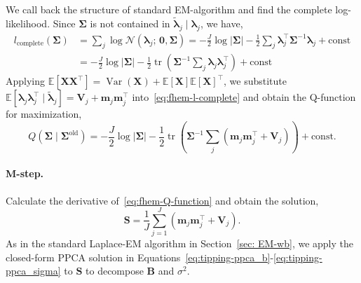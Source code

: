 We call back the structure of standard EM-algorithm and find the complete log-likelihood. Since $\bm{\Sigma}$ is not contained in $\tilde{\bm{\lambda}}_{j}\mid \bm{\lambda}_{j}$, we have,
\begin{align}
    l_{\text{complete}}\left(\bm{\Sigma}\right)&=\sum_{j}\log \mathcal{N}\left(\bm{\lambda}_{j};\,\bm{0},\bm{\Sigma}\right)=-\frac{J}{2}\log|\bm{\Sigma}| - \frac{1}{2}\sum_{j}\bm{\lambda}_j^{\top}\bm{\Sigma}^{-1}\bm{\lambda}_j + \text{const}\\
    &= -\frac{J}{2}\log|\bm{\Sigma}| - \frac{1}{2}\operatorname{tr}\left(\bm{\Sigma}^{-1}\sum_{j}\bm{\lambda}_j\bm{\lambda}_j^{\top}\right) + \text{const}
    \label{eq:fhem-l-complete}
\end{align}
Applying $\mathbb{E}\left[\mathbf{X}\mathbf{X}^{\top}\right]=\operatorname{Var}\left(\mathbf{X}\right)+\mathbb{E}\left[\mathbf{X}\right]\mathbb{E}\left[\mathbf{X}\right]^{\top}$, we substitute $\mathbb{E}\left[\bm{\lambda}_{j}\bm{\lambda}_{j}^{\top}\mid \tilde{\bm{\lambda}}_{j}\right]=\mathbf{V}_{j}+\mathbf{m}_{j}\mathbf{m}_{j}^{\top}$ into~\eqref{eq:fhem-l-complete} and obtain the Q-function for maximization,
\begin{equation}
    Q(\bm{\Sigma} \mid \bm{\Sigma}^{\text{old}}) = -\frac{J}{2}\log|\bm{\Sigma}| - \frac{1}{2}\operatorname{tr}\left(\bm{\Sigma}^{-1}\sum_{j}\left(\mathbf{m}_j\mathbf{m}_j^{\top} + \mathbf{V}_j\right)\right) + \text{const}.
    \label{eq:fhem-Q-function}
\end{equation}

\paragraph*{M-step.}
\label{para:fhem-mstep}
Calculate the derivative of~\eqref{eq:fhem-Q-function} and obtain the solution,
\begin{equation} \mathbf{S} = \frac{1}{J} \sum_{j=1}^{J} \left( \mathbf{m}_j \mathbf{m}_j^{\top} + \mathbf{V}_j \right). 
\label{eq:fhem_mstep} 
\end{equation}
As in the standard Laplace-EM algorithm in Section~\ref{sec: EM-wb}, we apply the closed-form PPCA solution in Equations~\eqref{eq:tipping-ppca_b}-\eqref{eq:tipping-ppca_sigma} to $\mathbf{S}$ to decompose $\mathbf{B}$ and $\sigma^{2}$.

